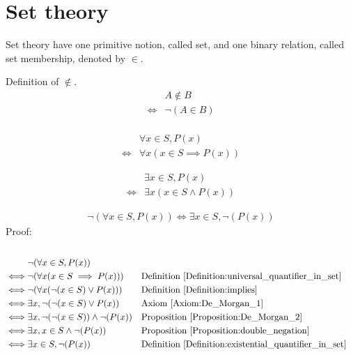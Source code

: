 \chapter{Set theory}
Set theory have one primitive notion, called set, and one binary relation, called set membership, denoted by $\in$.

\begin{defn}
\label{Definition:notin}
Definition of $\notin$.
\begin{align*}
& A \notin B \\
\iff & \lnot (A \in B) \\
\end{align*}
\end{defn}

\begin{defn}
\label{Definition:universal_quantifier_in_set}
\begin{align*}
& \forall x \in S, P(x) \\
\iff & \forall x (x \in S \implies P(x))
\end{align*}
\end{defn}

\begin{defn}
\label{Definition:existential_quantifier_in_set}
\begin{align*}
& \exists x \in S, P(x) \\
\iff & \exists x (x \in S \land P(x))
\end{align*}
\end{defn}

\begin{prop}
\begin{align*}
\lnot (\forall x \in S, P(x)) \iff \exists x \in S, \lnot (P(x))
\end{align*}
Proof: \\ \\
\begin{align*}
& \lnot (\forall x \in S, P(x)) \\
\iff & \lnot ( \forall x (x \in S \implies P(x)) )
&& \text{Definition \ref{Definition:universal_quantifier_in_set}} \\
\iff & \lnot ( \forall x (\lnot(x \in S) \lor P(x)) )
&& \text{Definition \ref{Definition:implies}} \\
\iff & \exists x, \lnot (\lnot(x \in S) \lor P(x))
&& \text{Axiom \ref{Axiom:De_Morgan_1}} \\
\iff & \exists x, \lnot (\lnot(x \in S)) \land \lnot (P(x))
&& \text{Proposition \ref{Proposition:De_Morgan_2}} \\
\iff & \exists x, x \in S \land \lnot (P(x))
&& \text{Proposition \ref{Proposition:double_negation}} \\
\iff & \exists x \in S, \lnot (P(x))
&& \text{Definition \ref{Definition:existential_quantifier_in_set}} \\
\end{align*}
\end{prop}


